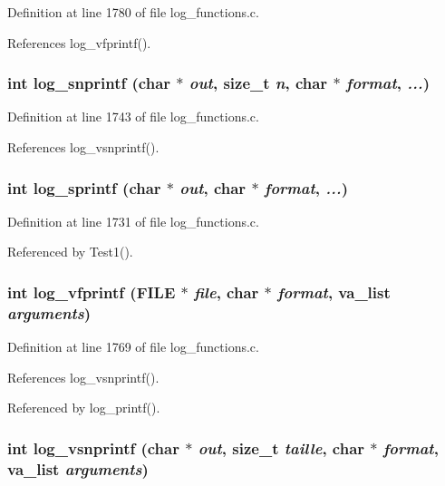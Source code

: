 Definition at line 1780 of file log\_\-functions.c.

References log\_\-vfprintf().
\subsubsection{\setlength{\rightskip}{0pt plus 5cm}int log\_\-snprintf (char $\ast$ {\em out}, size\_\-t {\em n}, char $\ast$ {\em format},  {\em ...})}\label{log__functions_8c_a96}




Definition at line 1743 of file log\_\-functions.c.

References log\_\-vsnprintf().
\subsubsection{\setlength{\rightskip}{0pt plus 5cm}int log\_\-sprintf (char $\ast$ {\em out}, char $\ast$ {\em format},  {\em ...})}\label{log__functions_8c_a95}




Definition at line 1731 of file log\_\-functions.c.

Referenced by Test1().
\subsubsection{\setlength{\rightskip}{0pt plus 5cm}int log\_\-vfprintf (FILE $\ast$ {\em file}, char $\ast$ {\em format}, va\_\-list {\em arguments})}\label{log__functions_8c_a98}




Definition at line 1769 of file log\_\-functions.c.

References log\_\-vsnprintf().

Referenced by log\_\-printf().
\subsubsection{\setlength{\rightskip}{0pt plus 5cm}int log\_\-vsnprintf (char $\ast$ {\em out}, size\_\-t {\em taille}, char $\ast$ {\em format}, va\_\-list {\em arguments})}\label{log__functions_8c_a94}




